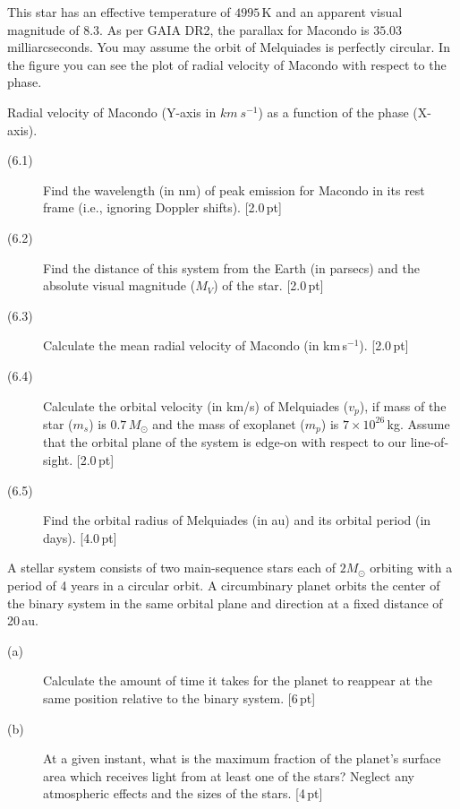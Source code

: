 This star has an effective temperature of $4995$\,K and an apparent visual
magnitude of $8.3$. As per GAIA DR2, the parallax for Macondo is $35.03$
milliarcseconds. You may assume the orbit of Melquiades is perfectly circular.
In the figure you can see the plot of radial velocity of Macondo with respect to
the phase.


Radial velocity of Macondo (Y-axis in $km\ s^{-1}$) as a function of the phase
(X-axis).

\begin{description}
\item[(6.1)] Find the wavelength (in nm) of peak emission for Macondo in its
  rest frame (i.e., ignoring Doppler shifts). \hfill[2.0\,pt]
\item[(6.2)] Find the distance of this system from the Earth (in parsecs) and
  the absolute visual magnitude ($M_V$) of the star. \hfill[2.0\,pt]
\item[(6.3)] Calculate the mean radial velocity of Macondo (in km\,s$^{-1}$).
  \hfill[2.0\,pt]
\item[(6.4)] Calculate the orbital velocity (in km/s) of Melquiades
  ($v_p$), if mass of the star ($m_s$) is $0.7\,M_\odot$ and the mass of
  exoplanet ($m_p$) is $7\times10^{26}$\,kg. Assume that the orbital plane of
  the system is edge-on with respect to our line-of-sight. \hfill[2.0\,pt]
\item[(6.5)] Find the orbital radius of Melquiades (in au) and its orbital
  period (in days). \hfill[4.0\,pt]
\end{description}

A stellar system consists of two main-sequence stars each of $2M_\odot$ orbiting
with a period of 4 years in a circular orbit. A circumbinary planet orbits the
center of the binary system in the same orbital plane and direction at a fixed
distance of 20\,au.

\begin{description}
\item[(a)] Calculate the amount of time it takes for the planet to reappear at
  the same position relative to the binary system. \hfill[6\,pt]
\item[(b)] At a given instant, what is the maximum fraction of the planet's
  surface area which receives light from at least one of the stars? Neglect any
  atmospheric effects and the sizes of the stars. \hfill[4\,pt]
\end{description}

